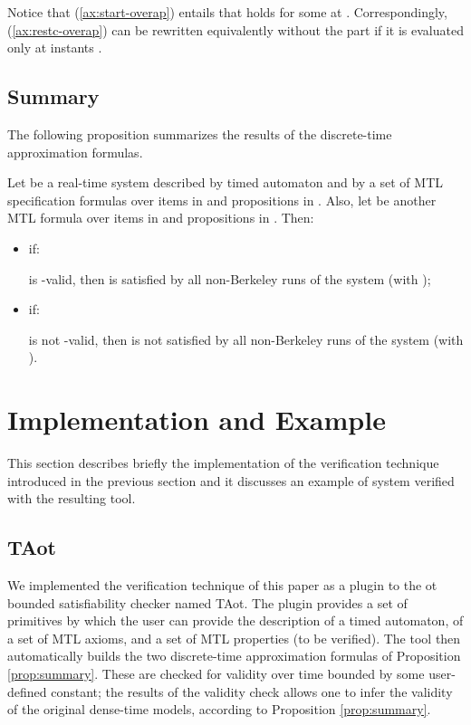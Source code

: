 \documentclass[a4paper]{article}
\newcommand{\frf}[1]{(\ref{#1})}
\newcommand{\zot}{ot}
\newcommand{\tazot}{\textsf{TA}ot}
\theoremstyle{plain}
\theoremstyle{definition}
\begin{document}
Notice that \frf{ax:start-overap} entails that  holds for some  at .
Correspondingly, \frf{ax:restc-overap} can be rewritten equivalently without the  part if it is evaluated only at instants .






\subsection{Summary}
The following proposition summarizes the results of the discrete-time approximation formulas.

\begin{proposition} \label{prop:summary}
Let  be a real-time system described by timed automaton  and by a set of MTL specification formulas  over items in  and propositions in .
Also, let  be another MTL formula over items in  and propositions in .
Then:
\begin{itemize}
\item if:
 
is -valid, then  is satisfied by all non-Berkeley runs  of the system (with );

\item if:
 
is not -valid, then  is not satisfied by all non-Berkeley runs  of the system (with ).
\end{itemize}
\end{proposition}






\section{Implementation and Example} \label{sec:impl-example}
This section describes briefly the implementation of the verification technique introduced in the previous section and it discusses an example of system verified with the resulting tool.


\subsection{\tazot{}}
We implemented the verification technique of this paper as a plugin to the \zot{} bounded satisfiability checker \cite{zot,PMS07} named \tazot{}.
The plugin provides a set of primitives by which the user can provide the description of a timed automaton, of a set of MTL axioms, and a set of MTL properties (to be verified).
The tool then automatically builds the two discrete-time approximation formulas of Proposition \ref{prop:summary}.
These are checked for validity over time  bounded by some user-defined constant; the results of the validity check allows one to infer the validity of the original dense-time models, according to Proposition \ref{prop:summary}.
\end{document}
